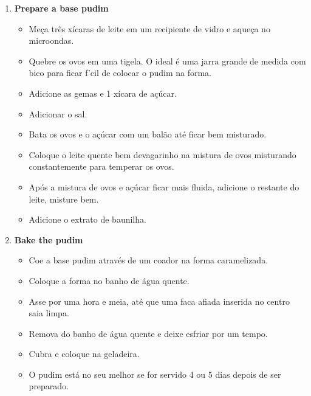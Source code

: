\documentclass [11pt, letterpaper] {article}
\begin{document}
\begin {description}
\begin {enumerate}
\begin {itemize}
\item Assim que alcançar a cor que deseja, despeje toda
mistura inteira no recipiente em que você vai assar o pudim.
\item Segurando o recipiente com luvas para forno, mova-o para
revestir o fundo completamente e para o caramelo subir um pouco aos lados.
\end {itemize}
\item {\bf Prepare a base pudim}
\begin {itemize}
\item Me\c{c}a tr\^es xícaras de leite em um recipiente de vidro e
aque\c{c}a no microondas.
\item Quebre os ovos em uma tigela. O ideal \'e uma jarra grande de medida com bico para ficar f\a'cil de colocar o pudim na forma.
\item Adicione as gemas e 1 xícara de açúcar.
\item Adicionar o sal.
        \item Bata os ovos e o açúcar com um bal\~ao até ficar bem misturado.
\item Coloque o leite quente bem devagarinho na mistura de ovos misturando constantemente
para temperar os ovos. 
\item Após a mistura de ovos e açúcar ficar mais fluida, adicione o
restante do leite, misture bem.
\item Adicione o extrato de baunilha.
\end {itemize}
\item {\bf Bake the pudim}
\begin {itemize}
\item Coe a base pudim através de um coador na
              forma caramelizada.
\item Coloque a forma no banho de água quente.
\item Asse por uma hora e meia, até que uma faca afiada inserida no
              centro saia limpa.
\item Remova do banho de água quente e deixe esfriar por um tempo.
\item Cubra e coloque na geladeira.
\item O pudim está no seu melhor se for servido 4 ou 5 dias depois de ser
preparado.
\end {itemize}
\end {enumerate}
\end {description}
\end{document}
